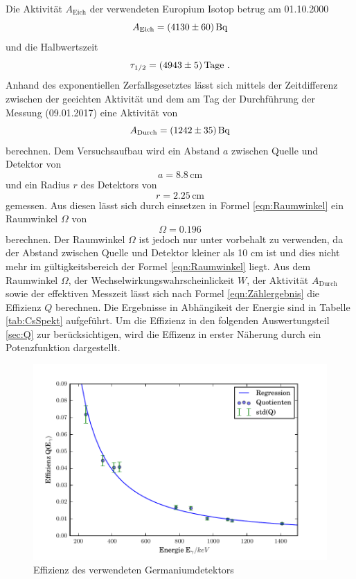 Die Aktivität $A_\text{Eich}$ der verwendeten Europium Isotop betrug am 01.10.2000
\begin{equation}
  A_\text{Eich} = (\num{4130 +- 60}) \, \text{Bq}
  \label{eqn:AktEu}
\end{equation}
und die Halbwertszeit
\begin{equation}
  \tau_{1/2} = (\num{4943 +- 5}) \, \text{Tage} \ .
  \label{eqn:halb}
\end{equation}
Anhand des exponentiellen Zerfallsgesetztes lässt sich mittels der Zeitdifferenz zwischen der geeichten Aktivität und dem am Tag der Durchführung der Messung (09.01.2017) eine Aktivität von
\begin{equation}
  A_\text{Durch} = (\num{1242 +- 35}) \, \text{Bq}
  \label{eqn:AktEEu}
\end{equation}
berechnen. Dem Versuchsaufbau wird ein Abstand $a$ zwischen Quelle und Detektor von
\begin{equation}
  a = 8.8 \, \text{cm}
\end{equation}
und ein Radius $r$ des Detektors von
\begin{equation}
  r = 2.25 \, \text{cm}
\end{equation}
gemessen. Aus diesen lässt sich durch einsetzen in Formel \ref{eqn:Raumwinkel} ein Raumwinkel $\Omega$ von
\begin{equation}
  \Omega = 0.196
  \label{eqn:Raum}
\end{equation}
berechnen. Der Raumwinkel $\Omega$ ist jedoch nur unter vorbehalt zu verwenden, da der Abstand zwischen Quelle und Detektor kleiner als 10 cm ist und dies nicht mehr im gültigkeitsbereich der Formel \ref{eqn:Raumwinkel} liegt. Aus dem Raumwinkel $\Omega$, der Wechselwirkungswahrscheinlickeit $W$, der Aktivität $A_\text{Durch}$ sowie der effektiven Messzeit lässt sich nach Formel \ref{eqn:Zählergebnis} die Effizienz $Q$ berechnen. Die Ergebnisse in Abhängikeit der Energie sind in Tabelle \ref{tab:CsSpekt} aufgeführt. Um die Effizienz in den folgenden Auswertungsteil \ref{sec:Q} zur berücksichtigen, wird die Effizenz in erster Näherung durch ein Potenzfunktion dargestellt.

\begin{figure}[H]
  \centering
  \includegraphics[width=\textwidth]{./build/Effizienz.pdf}
  \caption{Effizienz des verwendeten Germaniumdetektors}
  \label{fig:Efi}
\end{figure}

